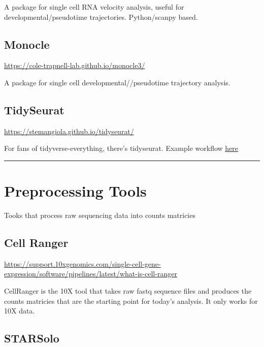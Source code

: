 \documentclass[
]{book}
\begin{document}
A package for single cell RNA velocity analysis, useful for developmental/pseudotime trajectories. Python/scanpy based.

\hypertarget{monocle}{%
\subsection*{Monocle}\label{monocle}}

\url{https://cole-trapnell-lab.github.io/monocle3/}

A package for single cell developmental//pseudotime trajectory analysis.

\hypertarget{tidyseurat}{%
\subsection*{TidySeurat}\label{tidyseurat}}

\url{https://stemangiola.github.io/tidyseurat/}

For fans of tidyverse-everything, there's tidyseurat. Example workflow \href{https://tidytranscriptomics-workshops.github.io/bioc2022_tidytranscriptomics/articles/tidytranscriptomics_case_study.html}{here}

\begin{center}\rule{0.5\linewidth}{0.5pt}\end{center}

\hypertarget{preprocessing-tools}{%
\section{Preprocessing Tools}\label{preprocessing-tools}}

Tooks that process raw sequencing data into counts matricies

\hypertarget{cell-ranger}{%
\subsection*{Cell Ranger}\label{cell-ranger}}

\url{https://support.10xgenomics.com/single-cell-gene-expression/software/pipelines/latest/what-is-cell-ranger}

CellRanger is the 10X tool that takes raw fastq sequence files and produces the counts matricies that are the starting point for today's analysis. It only works for 10X data.

\hypertarget{starsolo}{%
\subsection*{STARSolo}\label{starsolo}}
\end{document}
